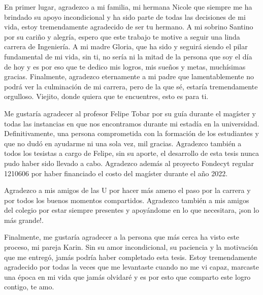 \documentclass[
	spanish, %
	letterpaper, oneside
]{book}
\begin{document}
\begin{acknowledgments}

En primer lugar, agradezco a mi familia, mi hermana Nicole que siempre me ha brindado su apoyo incondicional y ha sido parte de todas las decisiones de mi vida, estoy tremendamente agradecido de ser tu hermano. A mi sobrino Santino por su cariño y alegría, espero que este trabajo te motive a seguir una linda carrera de Ingeniería. A mi madre Gloria, que ha sido y seguirá siendo el pilar fundamental de mi vida, sin ti, no sería ni la mitad de la persona que soy el día de hoy y es por eso que te dedico mis logros, mis sueños y metas, muchísimas gracias. Finalmente, agradezco eternamente a mi padre que lamentablemente no podrá ver la culminación de mi carrera, pero de la que sé, estaría tremendamente orgulloso. Viejito, donde quiera que te encuentres, esto es para ti. 

\vspace{0.2cm}

Me gustaría agradecer al profesor Felipe Tobar por su guía durante el magíster y todas las instancias en que nos encontramos durante mi estadía en la universidad. Definitivamente, una persona comprometida con la formación de los estudiantes y que no dudó en ayudarme ni una sola vez, mil gracias. Agradezco también a todos los tesistas a cargo de Felipe, sin su aporte, el desarrollo de esta tesis nunca pudo haber sido llevado a cabo. Agradezco además al proyecto Fondecyt regular 1210606 por haber financiado el costo del magíster durante el año 2022.

\vspace{0.2cm}

Agradezco a mis amigos de las U por hacer más ameno el paso por la carrera y por todos los buenos momentos compartidos. Agradezco también a mis amigos del colegio por estar siempre presentes y apoyándome en lo que necesitara, ¡son lo más grande!. 

\vspace{0.2cm}

Finalmente, me gustaría agradecer a la persona que más cerca ha visto este proceso, mi pareja Karin. Sin su amor incondicional, su paciencia y la motivación que me entregó, jamás podría haber completado esta tesis. Estoy tremendamente agradecido por todas la veces que me levantaste cuando no me vi capaz, marcaste una época en mi vida que jamás olvidaré y es por esto que comparto este logro contigo, te amo. 


\end{acknowledgments}
\end{document}
